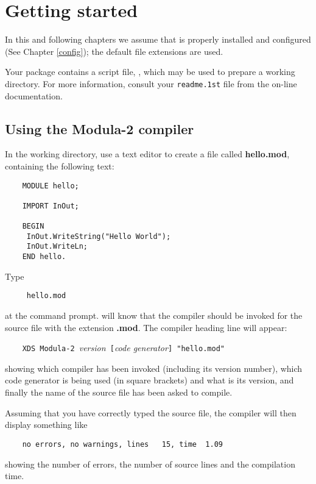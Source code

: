 
\chapter{Getting started}\label{start}

In this and following chapters we assume that
\xds{} is properly installed and configured
(See Chapter \ref{config});
the default file extensions are used.

Your \XDS{} package contains a script file, ,
which may be used to prepare a working directory.
For more information, consult your {\tt readme.1st} file from
the \XDS{} on-line documentation.

\section{Using the Modula-2 compiler}

In  the  working  directory,  use  a text editor to create a file
called {\bf hello.mod}, containing the following text:

\begin{verbatim}
    MODULE hello;

    IMPORT InOut;

    BEGIN
     InOut.WriteString("Hello World");
     InOut.WriteLn;
    END hello.
\end{verbatim}

Type

\verb'    '{\tt \XC{}}\verb' hello.mod'

at the command prompt. \xc{} will know that the \mt{} compiler
should be invoked for the source file with the extension {\bf.mod}.
The compiler heading line will appear:

\verb'    XDS Modula-2 '{\it version}\verb' ['{\it code generator}\verb'] "hello.mod"'

showing which compiler has been invoked
(including its version number), which code generator
is being used (in square brackets) and what is its version,
and finally the name of the source file \xc{} has been
asked to compile.

Assuming that you have correctly typed the source file,
the compiler will then display something like

\verb'    no errors, no warnings, lines   15, time  1.09'

showing the number of errors, the number of source lines
and the compilation time.

